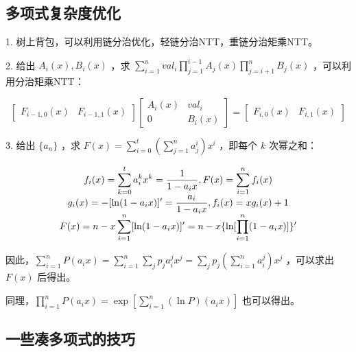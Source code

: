 \subsection{多项式复杂度优化}

1. 树上背包，可以利用链分治优化，轻链分治NTT，重链分治矩乘NTT。

2. 给出 $A_i(x),B_i(x)$ ，求 $\sum_{i=1}^{n}val_i\prod_{j=1}^{i-1}A_j(x)\prod_{j=i+1}^{n}B_j(x)$ ，可以利用分治矩乘NTT：

	\vspace{-0.4cm}

   $$
   \begin{bmatrix}F_{i-1,0}(x)&F_{i-1,1}(x)\end{bmatrix}\begin{bmatrix}A_i(x)&val_i\\0&B_i(x)\end{bmatrix}=\begin{bmatrix}F_{i,0}(x)&F_{i,1}(x)\end{bmatrix}
   $$

   \vspace{-0.3cm}

3. 给出 $\{a_n\}$ ，求 $F(x)=\sum_{i=0}^{t}(\sum_{j=1}^{n}a_j^i)x^i$ ，即每个 $k$ 次幂之和：

	\vspace{-0.4cm}

	$$
	\begin{array}{c}
	\displaystyle
	f_i(x)=\sum_{k=0}^{t}a_i^kx^k={1\over 1-a_ix},F(x)=\sum_{i=1}^{n}f_i(x)\\

	\displaystyle
	g_i(x)=-[\ln(1-a_ix)]'={a_i\over 1-a_ix},f_i(x)=xg_i(x)+1\\
	
	\displaystyle
	F(x)=n-x\sum_{i=1}^{n}[\ln(1-a_ix)]'=n-x\{{\ln[\prod_{i=1}^{n}(1-a_ix)]}\}'
	\end{array}
	$$

	\vspace{-0.2cm}

	因此，$\sum_{i=1}^{n}P(a_ix)=\sum_{i=1}^{n}\sum_j p_ja_i^jx^j=\sum_j p_j(\sum_{i=1}^{n}a_i^j)x^j$ ，可以求出 $F(x)$ 后得出。
   
	\vspace{0.1cm}

   同理，$\prod_{i=1}^{n}P(a_ix)=\exp[\sum_{i=1}^{n}(\ln P)(a_ix)]$ 也可以得出。

\subsection{一些凑多项式的技巧}

